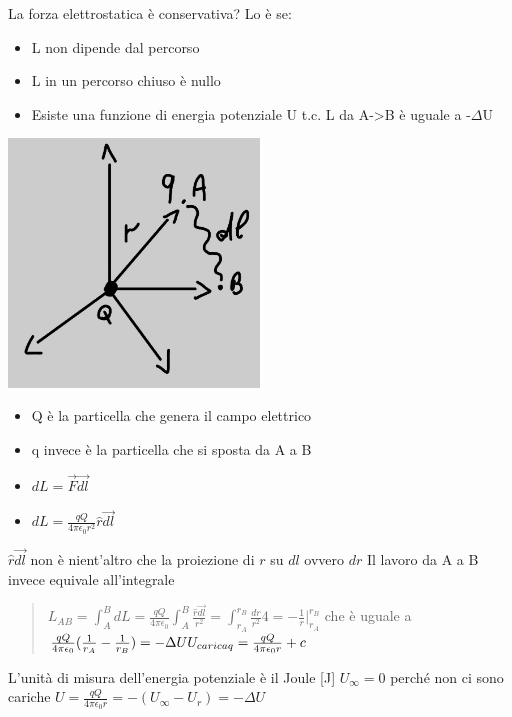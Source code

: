 \documentclass[a4paper, 12pt]{book}
\theoremstyle{plain}
\begin{document}
La forza elettrostatica è conservativa? Lo è se:
\begin{itemize}
    \item L non dipende dal percorso
    \item L in un percorso chiuso è nullo
    \item Esiste una funzione di energia potenziale U t.c. L da A->B è uguale a -$\Delta$U
\end{itemize}
\begin{center}
    \includegraphics[width=0.5\textwidth]{energia_elettrostatica_1.jpg}
\end{center}
\begin{itemize}
    \item Q è la particella che genera il campo elettrico
    \item q invece è la particella che si sposta da A a B
    \item $dL = \vec{F}\vec{dl}$
    \item $dL = \frac{qQ}{4\pi\epsilon_0r^2}\hat{r}\vec{dl}$
\end{itemize}
$\hat{r}\vec{dl}$ non è nient'altro che la proiezione di $r$ su $dl$ ovvero $dr$
\newline Il lavoro da A a B invece equivale all'integrale
\begin{quote}
    \begin{math}
        L_{AB} = \int^B_A dL = \frac{qQ}{4\pi\epsilon_0} \int^B_A \frac{\hat{r}\vec{dl}}{r^2} = \int^{r_B}_{r_A} \frac{dr}{r^2} 4
        = -\frac{1}{r}|^{r_B}_{r_A}
    \end{math}
    che è uguale a 
    \begin{math}
        \frac{qQ}{4\pi\epsilon_0}(\frac{1}{r_A}-\frac{1}{r_B}) = -\Delta U\\
        \newline U_{carica q} = \frac{qQ}{4\pi\epsilon_0r}+c
    \end{math}
\end{quote}
L'unità di misura dell'energia potenziale è il Joule [J]
\newline $U_\infty = 0$ perché non ci sono cariche
\newline $U = \frac{qQ}{4\pi\epsilon_0r} = -(U_\infty-U_r) = -\Delta U$
\end{document}
